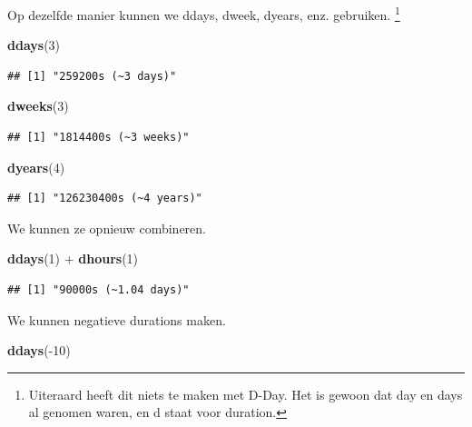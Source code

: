 \documentclass[]{tufte-book}
\newenvironment{Shaded}{}{}
\newcommand{\DecValTok}[1]{\textcolor[rgb]{0.25,0.63,0.44}{#1}}
\newcommand{\KeywordTok}[1]{\textcolor[rgb]{0.00,0.44,0.13}{\textbf{#1}}}
\newcommand{\NormalTok}[1]{#1}
\newcommand{\OperatorTok}[1]{\textcolor[rgb]{0.40,0.40,0.40}{#1}}
\newcommand{\StringTok}[1]{\textcolor[rgb]{0.25,0.44,0.63}{#1}}
\begin{document}
Op dezelfde manier kunnen we ddays, dweek, dyears, enz. gebruiken. \footnote{Uiteraard heeft dit niets te maken met D-Day. Het is gewoon dat day en days al genomen waren, en d staat voor duration.}

\begin{Shaded}
\begin{Highlighting}[]
\KeywordTok{ddays}\NormalTok{(}\DecValTok{3}\NormalTok{)}
\end{Highlighting}
\end{Shaded}

\begin{verbatim}
## [1] "259200s (~3 days)"
\end{verbatim}

\begin{Shaded}
\begin{Highlighting}[]
\KeywordTok{dweeks}\NormalTok{(}\DecValTok{3}\NormalTok{)}
\end{Highlighting}
\end{Shaded}

\begin{verbatim}
## [1] "1814400s (~3 weeks)"
\end{verbatim}

\begin{Shaded}
\begin{Highlighting}[]
\KeywordTok{dyears}\NormalTok{(}\DecValTok{4}\NormalTok{)}
\end{Highlighting}
\end{Shaded}

\begin{verbatim}
## [1] "126230400s (~4 years)"
\end{verbatim}

We kunnen ze opnieuw combineren.

\begin{Shaded}
\begin{Highlighting}[]
\KeywordTok{ddays}\NormalTok{(}\DecValTok{1}\NormalTok{) }\OperatorTok{+}\StringTok{ }\KeywordTok{dhours}\NormalTok{(}\DecValTok{1}\NormalTok{)}
\end{Highlighting}
\end{Shaded}

\begin{verbatim}
## [1] "90000s (~1.04 days)"
\end{verbatim}

We kunnen negatieve durations maken.

\begin{Shaded}
\begin{Highlighting}[]
\KeywordTok{ddays}\NormalTok{(}\OperatorTok{-}\DecValTok{10}\NormalTok{)}
\end{Highlighting}
\end{Shaded}
\end{document}
